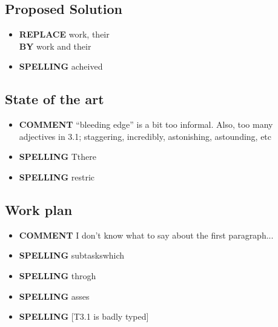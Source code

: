 \documentclass[11pt]{scrartcl} %
\begin{document}
\subsection*{Proposed Solution}
\begin{itemize}
	\item {\bf REPLACE} work, their \\{\bf BY} work and their
	\item {\bf SPELLING} acheived 
\end{itemize}

\subsection*{State of the art}
\begin{itemize}
	\item {\bf COMMENT} ``bleeding edge'' is a bit too informal. Also, too many adjectives in 3.1; staggering, incredibly, astonishing, astounding, etc  
	\item {\bf SPELLING} Tthere
	\item {\bf SPELLING} restric
\end{itemize}

\subsection*{Work plan}
\begin{itemize}
	\item {\bf COMMENT} I don't know what to say about the first paragraph...
	\item {\bf SPELLING} subtaskswhich
	\item {\bf SPELLING} throgh
	\item {\bf SPELLING} asses
	\item {\bf SPELLING} [T3.1 is badly typed]
\end{itemize}
\end{document}
